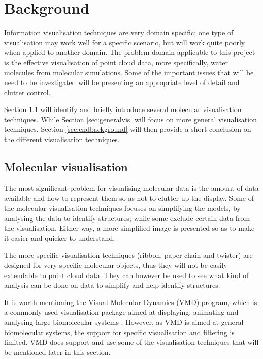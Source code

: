 \graphicspath{{./background/}}

\chapter{Background}
\label{cha:background}


Information visualisation techniques are very domain specific; one type of
visualisation may work well for a specific scenario, but will work quite poorly
when applied to another domain. The problem domain applicable to this project
is the effective visualisation of point cloud data, more specifically, water
molecules from molecular simulations. Some of the important issues that will be
need to be investigated will be presenting an appropriate level of detail and
clutter control.

Section \ref{sec:molecularvis} will identify and briefly introduce several
molecular visualisation techniques. While Section \ref{sec:generalvis} will
focus on more general visualisation techniques. Section \ref{sec:endbackground}
will then provide a short conclusion on the different visualisation techniques.



\section{Molecular visualisation}
\label{sec:molecularvis}


The most significant problem for visualising molecular data is the amount of
data available and how to represent them so as not to clutter up the display.
Some of the molecular visualisation techniques focuses on simplifying the
models, by analysing the data to identify structures; while some exclude
certain data from the visualisation. Either way, a more simplified image is
presented so as to make it easier and quicker to understand.

The more specific visualisation techniques (ribbon, paper chain and twister) are
designed for very specific molecular objects, thus they will not be easily
extendable to point cloud data. They can however be used to see what kind of
analysis can be done on data to simplify and help identify structures.

It is worth mentioning the Visual Molecular Dynamics (VMD) \citep{humphrey96}
program, which is a commonly used visualisation package aimed at displaying,
animating and analysing large biomolecular systems \citep{VMD}. However, as VMD
is aimed at general biomolecular systems, the support for specific
visualisation and filtering is limited. VMD does support and use some of the
visualisation techniques that will be mentioned later in this section.

